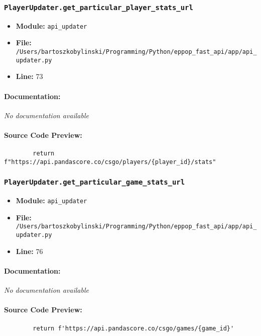 \documentclass[11pt,a4paper]{article}
\begin{document}
\vspace{1em}
\subsubsection{\texttt{PlayerUpdater.get\_particular\_player\_stats\_url}}

\begin{itemize}
    \item \textbf{Module:} \texttt{api\_updater}
    \item \textbf{File:} \texttt{/Users/bartoszkobylinski/Programming/Python/eppop\_fast\_api/app/api\_updater.py}
    \item \textbf{Line:} 73
\end{itemize}

\paragraph{Documentation:} \textit{No documentation available}

\paragraph{Source Code Preview:}
\begin{verbatim}
        return f"https://api.pandascore.co/csgo/players/{player_id}/stats"
\end{verbatim}

\vspace{1em}
\subsubsection{\texttt{PlayerUpdater.get\_particular\_game\_stats\_url}}

\begin{itemize}
    \item \textbf{Module:} \texttt{api\_updater}
    \item \textbf{File:} \texttt{/Users/bartoszkobylinski/Programming/Python/eppop\_fast\_api/app/api\_updater.py}
    \item \textbf{Line:} 76
\end{itemize}

\paragraph{Documentation:} \textit{No documentation available}

\paragraph{Source Code Preview:}
\begin{verbatim}
        return f'https://api.pandascore.co/csgo/games/{game_id}'
\end{verbatim}
\end{document}
